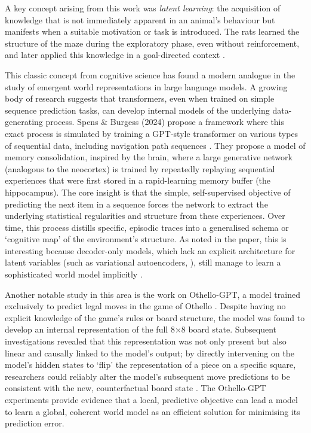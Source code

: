 A key concept arising from this work was \textit{latent learning}: the acquisition of knowledge that is not immediately apparent in an animal's behaviour but manifests when a suitable motivation or task is introduced. The rats learned the structure of the maze during the exploratory phase, even without reinforcement, and later applied this knowledge in a goal-directed context \citep{okeefe1978hippocampus, BEHRENS2018490, whittington2022howtobuild}.

This classic concept from cognitive science has found a modern analogue in the study of emergent world representations in large language models. A growing body of research suggests that transformers, even when trained on simple sequence prediction tasks, can develop internal models of the underlying data-generating process. Spens \& Burgess (2024) propose a framework where this exact process is simulated by training a GPT-style transformer on various types of sequential data, including navigation path sequences \citep{Spens2024consolidation}. They propose a model of memory consolidation, inspired by the brain, where a large generative network (analogous to the neocortex) is trained by repeatedly replaying sequential experiences that were first stored in a rapid-learning memory buffer (the hippocampus). The core insight is that the simple, self-supervised objective of predicting the next item in a sequence forces the network to extract the underlying statistical regularities and structure from these experiences. Over time, this process distills specific, episodic traces into a generalised schema or `cognitive map' of the environment's structure. As noted in the paper, this is interesting because decoder-only models, which lack an explicit architecture for latent variables (such as variational autoencoders, \citep{kingma2022autoencodingvariationalbayes}), still manage to learn a sophisticated world model implicitly \citep{Spens2024consolidation}. 

Another notable study in this area is the work on Othello-GPT, a model trained exclusively to predict legal moves in the game of Othello \citep{li2024emergentworldrepresentationsexploring}. Despite having no explicit knowledge of the game's rules or board structure, the model was found to develop an internal representation of the full 8×8 board state. Subsequent investigations revealed that this representation was not only present but also linear and causally linked to the model's output; by directly intervening on the model's hidden states to `flip' the representation of a piece on a specific square, researchers could reliably alter the model's subsequent move predictions to be consistent with the new, counterfactual board state \citep{nanda_othello_2023}. The Othello-GPT experiments provide evidence that a local, predictive objective can lead a model to learn a global, coherent world model as an efficient solution for minimising its prediction error.

